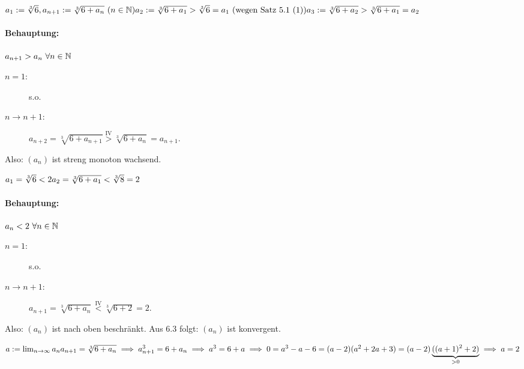 \documentclass[a4paper,oneside,DIV15,BCOR12mm]{scrbook}
\begin{document}
\begin{beispiel}
\begin{math}
a_1:=\sqrt[3]{6}, a_{n+1}:=\sqrt[3]{6+a_n}\ (n\in\mathbb{N})\\
a_2:=\sqrt[3]{6+a_1} > \sqrt[3]{6}=a_1\text{ (wegen Satz 5.1 (1))}\\
a_3:=\sqrt[3]{6+a_2} > \sqrt[3]{6+a_1}=a_2
\end{math}

\paragraph{Behauptung:}
$a_{n+1}>a_n\ \forall n\in\mathbb{N}$

\begin{beweis}
\begin{description}
\item[$n=1$:] s.o.
\item[$n\longrightarrow n+1$:] $a_{n+2}=\sqrt[3]{6+a_{n+1}} \stackrel{\text{IV}}{>} \sqrt[3]{6+a_n}=a_{n+1}.$
\end{description}
\end{beweis}

Also: $(a_n)$ ist streng monoton wachsend.

\begin{math}
a_1=\sqrt[3]{6} < 2\\
a_2=\sqrt[3]{6+a_1} < \sqrt[3]{8}=2
\end{math}

\paragraph{Behauptung:}
$a_n<2\ \forall n\in\mathbb{N}$

\begin{beweis}
\begin{description}
\item[$n=1$:] s.o.
\item[$n\longrightarrow n+1$:] $a_{n+1}=\sqrt[3]{6+a_n} \stackrel{\text{IV}}{<} \sqrt[3]{6+2}=2.$
\end{description}
\end{beweis}

Also: $(a_n)$ ist nach oben beschränkt. Aus 6.3 folgt: $(a_n)$ ist konvergent.

\begin{math}
a:=\lim_{n\rightarrow\infty}{a_n}\\
a_{n+1}=\sqrt[3]{6+a_n} \implies a_{n+1}^3=6+a_n \implies a^3=6+a\\
\implies 0=a^3-a-6=(a-2)(a^2+2a+3)=(a-2)\underbrace{((a+1)^2+2)}_{>0} \implies a=2
\end{math}
\end{beispiel}
\end{document}
